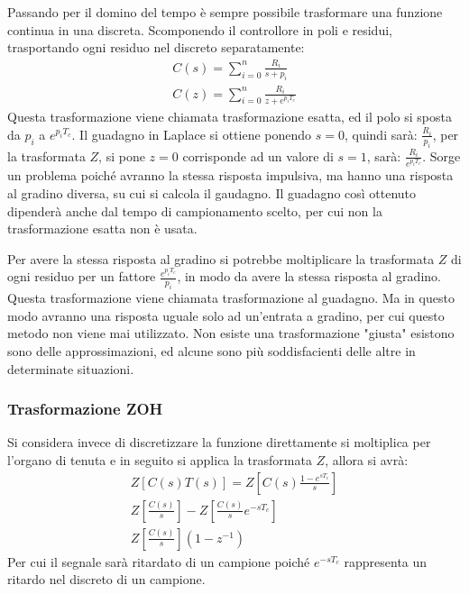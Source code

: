 \documentclass{article}
\numberwithin{equation}{subsection}
\begin{document}
Passando per il domino del tempo è sempre possibile trasformare una funzione continua in una discreta. Scomponendo il controllore in poli e 
residui, trasportando ogni residuo nel discreto separatamente:
\begin{gather}
    C(s)=\displaystyle\sum_{i=0}^{n}\frac{R_i}{s+p_i}\\
    C(z)=\displaystyle\sum_{i=0}^{n}\frac{R_i}{z+e^{p_iT_c}}
\end{gather}
Questa trasformazione viene chiamata trasformazione esatta, ed il polo si sposta da $p_i$ a $e^{p_iT_c}$. Il guadagno in Laplace si ottiene ponendo $s=0$, quindi sarà: 
$\displaystyle\frac{R_i}{p_i}$, per la trasformata $Z$, si pone $z=0$ corrisponde ad un valore di $s=1$, sarà: $\displaystyle\frac{R_i}{e^{p_iT_c}}$. Sorge un problema 
poiché avranno la stessa risposta impulsiva, ma hanno una risposta al gradino diversa, su cui si calcola il gaudagno. Il guadagno così ottenuto dipenderà anche dal tempo 
di campionamento scelto, per cui non la trasformazione esatta non è usata. 

Per avere la stessa risposta al gradino si potrebbe 
moltiplicare la trasformata $Z$ di ogni residuo per un fattore $\displaystyle\frac{e^{p_iT_c}}{p_i}$, in modo da avere la stessa risposta al gradino. Questa trasformazione 
viene chiamata trasformazione al guadagno. Ma in questo modo 
avranno una risposta uguale solo ad un'entrata a gradino, per cui questo metodo non viene mai utilizzato. Non esiste una trasformazione "giusta" esistono sono delle 
approssimazioni, ed alcune sono più soddisfacienti delle altre in determinate situazioni.  

\subsubsection{Trasformazione ZOH}

Si considera invece di discretizzare la funzione direttamente si moltiplica per l'organo di tenuta e in seguito si applica la trasformata $Z$, allora si avrà:
\begin{gather}
    Z\left[C(s)T(s)\right]=Z\left[C(s)\displaystyle\frac{1-e^{sT_c}}{s}\right]\\
    Z\left[\displaystyle\frac{C(s)}{s}\right]-Z\left[\displaystyle\frac{C(s)}{s}e^{-sT_c}\right]\\
    Z\left[\displaystyle\frac{C(s)}{s}\right](1-z^{-1})
\end{gather}
Per cui il segnale sarà ritardato di un campione poiché $e^{-sT_c}$ rappresenta un ritardo nel discreto di un campione. 
\end{document}
